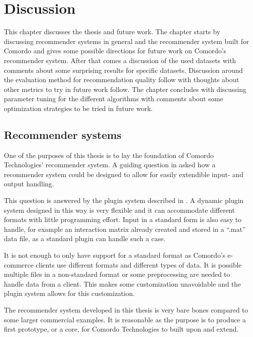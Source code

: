 \chapter{Discussion}\label{cha:discussion}

This chapter discusses the thesis and future work. The chapter starts by discussing recommender systems in general and the recommender system built for Comordo and gives some possible directions for future work on Comordo's recommender system. After that comes a discussion of the used datasets with comments about some surprising results for specific datasets. Discussion around the evaluation method for recommendation quality follow with thoughts about other metrics to try in future work follow. The chapter concludes with discussing parameter tuning for the different algorithms with comments about some optimization strategies to be tried in future work.


\section{Recommender systems}

One of the purposes of this thesis is to lay the foundation of Comordo Technologies' recommender system. A guiding question in  asked how a recommender system could be designed to allow for easily extendible input- and output handling.

This question is answered by the plugin system described in . A dynamic plugin system designed in this way is very flexible and it can accommodate different formats with little programming effort. Input in a standard form is also easy to handle, for example an interaction matrix already created and stored in a ``.mat'' data file, as a standard plugin can handle such a case.

It is not enough to only have support for a standard format as Comordo's e-commerce clients use different formats and different types of data. It is possible multiple files in a non-standard format or some preprocessing are needed to handle data from a client. This makes some customization unavoidable and the plugin system allows for this customization.

The recommender system developed in this thesis is very bare bones compared to some larger commercial examples. It is reasonable as the purpose is to produce a first prototype, or a core, for Comordo Technologies to built upon and extend.

